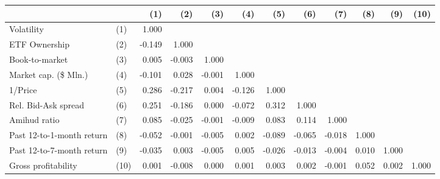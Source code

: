 \begin{tabular}{llrrrrrrrrrr}
\toprule
                    &      & (1) & (2) & (3) & (4) & (5) & (6) & (7) & (8) & (9) & (10)\\
\midrule
Volatility & (1) &  1.000 &        &        &        &        &        &        &       &       &       \\
ETF Ownership & (2) & -0.149 &  1.000 &        &        &        &        &        &       &       &       \\
Book-to-market & (3) &  0.005 & -0.003 &  1.000 &        &        &        &        &       &       &       \\
Market cap. (\$ Mln.) & (4) & -0.101 &  0.028 & -0.001 &  1.000 &        &        &        &       &       &       \\
1/Price & (5) &  0.286 & -0.217 &  0.004 & -0.126 &  1.000 &        &        &       &       &       \\
Rel. Bid-Ask spread & (6) &  0.251 & -0.186 &  0.000 & -0.072 &  0.312 &  1.000 &        &       &       &       \\
Amihud ratio & (7) &  0.085 & -0.025 & -0.001 & -0.009 &  0.083 &  0.114 &  1.000 &       &       &       \\
Past 12-to-1-month return & (8) & -0.052 & -0.001 & -0.005 &  0.002 & -0.089 & -0.065 & -0.018 & 1.000 &       &       \\
Past 12-to-7-month return & (9) & -0.035 &  0.003 & -0.005 &  0.005 & -0.026 & -0.013 & -0.004 & 0.010 & 1.000 &       \\
Gross profitability & (10) &  0.001 & -0.008 &  0.000 &  0.001 &  0.003 &  0.002 & -0.001 & 0.052 & 0.002 & 1.000 \\
\bottomrule
\end{tabular}
